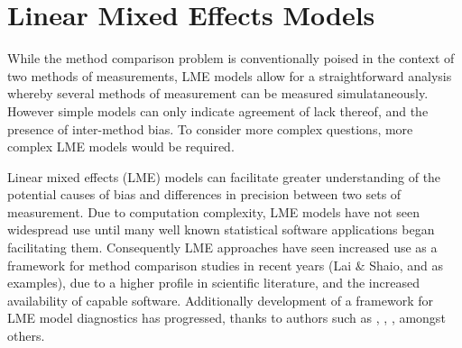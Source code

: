 \documentclass[12pt, a4paper]{report}
\author{ } \date{ }
\theoremstyle{definition}
\theoremstyle{remark}
\begin{document}


%
%
%
%  

\chapter{Linear Mixed Effects Models}
While the method comparison problem is conventionally poised in the context of two methods of measurements, LME models allow for a straightforward analysis whereby several methods of measurement can be measured simulataneously. However simple models can only indicate agreement of lack thereof, and the presence of inter-method bias. To consider more complex questions, more complex LME models would be required.

Linear mixed effects (LME) models can facilitate greater understanding of the potential causes of bias and differences in precision between two sets of measurement. Due to computation complexity, LME models have not seen widespread use until many well known statistical software applications began facilitating them. Consequently LME approaches have seen increased use as a framework for method comparison studies in recent years (Lai $\&$ Shaio, \citet{BXC2004,BXC2008} and \citet{ARoy2009} as examples), due to a higher profile in scientific literature, and the increased availability of capable software. Additionally development of a framework for LME model diagnostics has progressed, thanks to authors such as \citet{schabenberger}, \citet{Christensen}, \citet{cook86} \citet{west}, amongst others.
\end{document}
